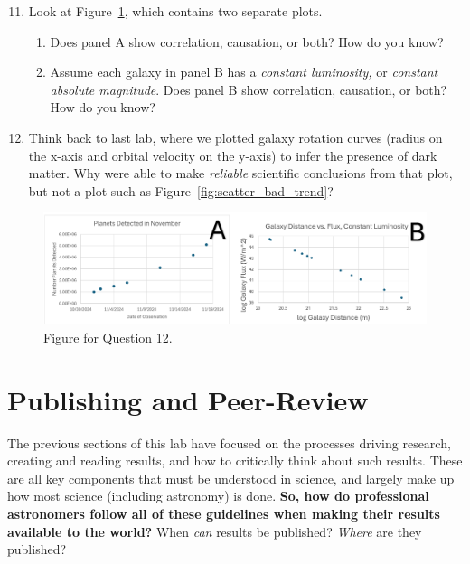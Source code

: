 \documentclass[11pt]{article}%
\begin{document}
\begin{enumerate}
\setcounter{enumi}{10}
    \item Look at Figure~\ref{fig:correlation_causation}, which contains two separate plots.
    \begin{enumerate}
        \item Does panel A show correlation, causation, or both? How do you know?
        \item Assume each galaxy in panel B has a \textit{constant luminosity,} or \textit{constant absolute magnitude}. Does panel B show correlation, causation, or both? How do you know?
    \end{enumerate}

    \item Think back to last lab, where we plotted galaxy rotation curves (radius on the x-axis and orbital velocity on the y-axis) to infer the presence of dark matter. Why were able to make \textit{reliable} scientific conclusions from that plot, but not a plot such as Figure~\ref{fig:scatter_bad_trend}?

\end{enumerate}

\begin{figure}
    \centering
    \includegraphics[width=\linewidth]{Images/correlation_causation.png}
    \caption{Figure for Question 12.}
    \label{fig:correlation_causation}
\end{figure}


\bigskip 

\section{Publishing and Peer-Review}

The previous sections of this lab have focused on the processes driving research, creating and reading results, and how to critically think about such results. These are all key components that must be understood in science, and largely make up how most science (including astronomy) is done. \textbf{So, how do professional astronomers follow all of these guidelines when making their results available to the world?} When \textit{can} results be published? \textit{Where} are they published?
\end{document}

